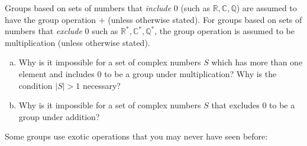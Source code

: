 \begin{rem}
Groups based on sets of numbers that \emph{include} 0 (such as ${\mathbb R}, {\mathbb C}, {\mathbb Q}$) are assumed to have the group operation $+$ (unless otherwise stated). For groups based on sets of numbers that \emph{exclude} $0$ such as ${\mathbb R^\ast}, {\mathbb C^\ast}, {\mathbb Q^\ast}$, the group operation is assumed to be multiplication (unless otherwise stated).
\end{rem}
 
\begin{exercise}{15}
\begin{enumerate}[(a)]
\item
Why is it impossible for a set of complex numbers $S$ which has more than one element and  includes 0 to be a group under multiplication?  Why is the condition $|S|>1$ necessary?
\item
 Why is it impossible for a set of complex numbers $S$ that excludes 0 to be a group under addition?
\end{enumerate}
\end{exercise} 
 
Some groups use exotic operations that you may never have seen before:

